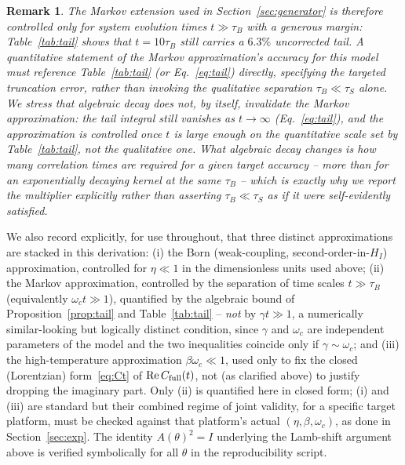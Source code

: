 \documentclass[aps,pra,reprint,superscriptaddress,nofootinbib,longbibliography]{revtex4-2}
\newtheorem{remark}[theorem]{Remark}
\begin{document}
\begin{remark}
The Markov extension used in Section~\ref{sec:generator} is therefore
controlled only for system evolution times $t\gg\tau_B$ with a
generous margin: Table~\ref{tab:tail} shows that $t=10\tau_B$ still
carries a $6.3\%$ uncorrected tail. A quantitative statement of the
Markov approximation's accuracy for this model must reference
Table~\ref{tab:tail} (or Eq.~\eqref{eq:tail}) directly, specifying the
targeted truncation error, rather than invoking the qualitative
separation $\tau_B\ll\tau_S$ alone. We stress that algebraic decay
does not, by itself, invalidate the Markov approximation: the tail
integral still vanishes as $t\to\infty$ (Eq.~\eqref{eq:tail}), and the
approximation is controlled once $t$ is large enough on the
\emph{quantitative} scale set by Table~\ref{tab:tail}, not the
qualitative one. What algebraic decay changes is how many correlation
times are required for a given target accuracy -- more than for an
exponentially decaying kernel at the same $\tau_B$ -- which is exactly
why we report the multiplier explicitly rather than asserting
$\tau_B\ll\tau_S$ as if it were self-evidently satisfied.
\end{remark}

We also record explicitly, for use throughout, that three distinct
approximations are stacked in this derivation: (i) the Born
(weak-coupling, second-order-in-$H_I$) approximation, controlled for
$\eta\ll1$ in the dimensionless units used above; (ii) the Markov
approximation, controlled by the separation of time scales
$t\gg\tau_B$ (equivalently $\omega_c t\gg1$), quantified by the
algebraic bound of Proposition~\ref{prop:tail} and
Table~\ref{tab:tail} -- \emph{not} by $\gamma t\gg1$, a numerically
similar-looking but logically distinct condition, since $\gamma$ and
$\omega_c$ are independent parameters of the model and the two
inequalities coincide only if $\gamma\sim\omega_c$; and (iii) the
high-temperature approximation $\beta\omega_c\ll1$, used only to fix
the closed (Lorentzian) form~\eqref{eq:Ct} of ${\rm Re}\,C_{\rm
full}(t)$, not (as clarified above) to justify dropping the imaginary
part. Only (ii) is quantified here in closed form; (i) and (iii) are
standard but their combined regime of joint validity, for a specific
target platform, must be checked against that platform's actual
$(\eta,\beta,\omega_c)$, as done in Section~\ref{sec:exp}. The
identity $A(\theta)^2=I$ underlying the Lamb-shift argument above is
verified symbolically for all $\theta$ in the reproducibility script.
\end{document}
